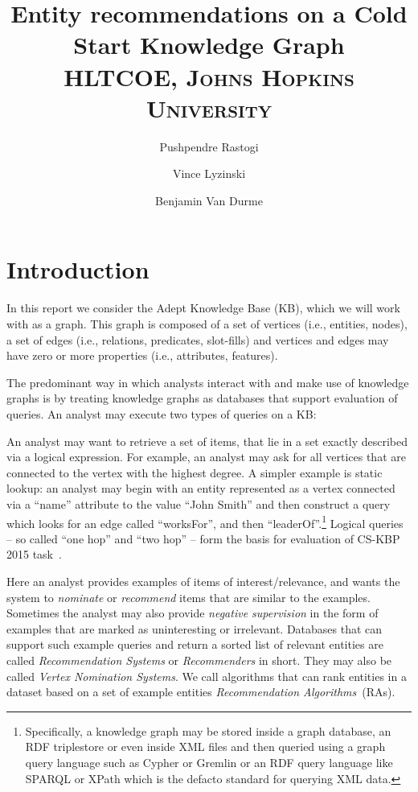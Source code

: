 \documentclass[paper=a4,fontsize=11pt]{scrartcl}
\title{
  \vspace{-1in}
  {\normalfont\huge Entity recommendations on a Cold Start Knowledge Graph}\\
  {\normalfont\normalsize\textsc{HLTCOE, Johns Hopkins University}}\\
}
\author{{\normalfont\normalsize Pushpendre Rastogi}
  \and
  {\normalfont\normalsize Vince Lyzinski}
  \and
  {\normalfont\normalsize Benjamin Van Durme}\\
}
\date{}
\newcommand{\ie}{i.e.,\xspace}
\numberwithin{equation}{section}    %
\numberwithin{figure}{section}      %
\numberwithin{table}{section}       %
\newcommand{\task}{CS-KBP 2015 task\ }
\begin{document}
\maketitle
\section{Introduction}
\label{sec:introduction}
In this report we consider the Adept Knowledge Base (KB), which we
will work with as a graph. This graph is composed of a set of
vertices (\ie entities, nodes), a set of edges (\ie relations,
predicates, slot-fills) and vertices and edges may have zero or more
properties (\ie attributes, features).

The predominant way in which analysts interact with and make use of knowledge
graphs is by treating knowledge graphs as databases that support evaluation
of queries. An analyst may execute two types of queries on a KB:
\begin{description}[leftmargin=*]
\item[Logical Queries] An analyst may want to retrieve a set of items,
  that lie in a set exactly described via a logical expression. For example, an analyst
may ask for all vertices that are connected to the vertex with the highest
degree.  A simpler example is static lookup: an
analyst may begin with an entity represented as a vertex connected via a
``name'' attribute to the value ``John Smith'' and then construct a query which
looks for an edge called ``worksFor'', and then ``leaderOf''.\footnote
{Specifically, a knowledge graph may be stored inside a graph database,
an RDF {triplestore} or even inside XML files and then queried using a graph
query language such as Cypher or Gremlin or an RDF query language like SPARQL
or XPath which is the defacto standard for querying XML data.}  Logical queries -- so called ``one hop'' and ``two hop'' -- form the basis for evaluation of \task.
\item[Example Queries] Here an analyst provides {examples} of items of
  interest/relevance, and wants the system to \textit{nominate} or \textit{recommend}
  items that are similar to the examples. Sometimes the analyst may also
  provide \textit{negative supervision} in the form of examples that are marked
  as uninteresting or irrelevant. Databases that can support such
  example queries and return a sorted list of relevant entities are called
  \textit{Recommendation Systems} or \textit{Recommenders} in short. They may
  also be called \textit{Vertex Nomination Systems}. We call algorithms
that can rank entities in a dataset based on a set of example entities
\textit{Recommendation Algorithms}~(RAs).
\end{description}
\end{document}

